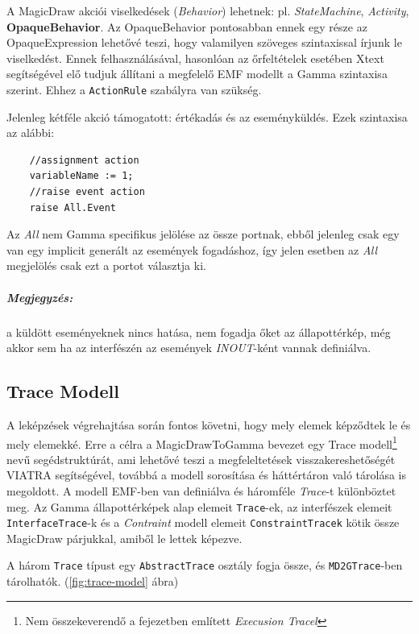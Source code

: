 A MagicDraw akciói viselkedések (\emph{Behavior}) lehetnek: pl. \emph{StateMachine}, \emph{Activity}, \textbf{OpaqueBehavior}. Az OpaqueBehavior pontosabban ennek egy része az OpaqueExpression lehetővé teszi, hogy valamilyen szöveges szintaxissal írjunk le viselkedést. Ennek felhasználásával, hasonlóan az őrfeltételek esetében Xtext segítségével elő tudjuk állítani a megfelelő EMF modellt a Gamma szintaxisa szerint. Ehhez a \verb+ActionRule+ szabályra van szükség.

Jelenleg kétféle akció támogatott: értékadás és az eseményküldés. Ezek szintaxisa az alábbi:

\begin{lstlisting}
	//assignment action
	variableName := 1;
	//raise event action
	raise All.Event
\end{lstlisting}

Az \emph{All} nem Gamma specifikus jelölése az össze portnak, ebből jelenleg csak egy van egy implicit generált az események fogadáshoz, így jelen esetben az \emph{All} megjelölés csak ezt a portot választja ki.

\subparagraph{Megjegyzés:} a küldött eseményeknek nincs hatása, nem fogadja őket az állapottérkép, még akkor sem ha az interfészén az események \emph{INOUT}-ként vannak definiálva.

\subsection{Trace Modell}
\label{sec:trace_model}
A leképzések végrehajtása során fontos követni, hogy mely elemek képződtek le és mely elemekké. Erre a célra a MagicDrawToGamma bevezet egy Trace modell\footnote{Nem összekeverendő a  fejezetben említett \emph{Execusion Tracel}} nevű segédstruktúrát, ami lehetővé teszi a megfeleltetések visszakereshetőségét VIATRA segítségével, továbbá a modell sorosítása és háttértáron való tárolása is megoldott. A modell EMF-ben van definiálva és  háromféle \emph{Trace}-t különböztet meg. Az Gamma állapottérképek alap elemeit \verb+Trace+-ek, az interfészek elemeit \verb+InterfaceTrace+-k és a \emph{Contraint} modell elemeit \verb+ConstraintTracek+ kötik össze MagicDraw párjukkal, amiből le lettek képezve.

A három \verb+Trace+ típust egy \verb+AbstractTrace+ osztály fogja össze, és \verb+MD2GTrace+-ben tárolhatók. (\ref{fig:trace-model} ábra)

